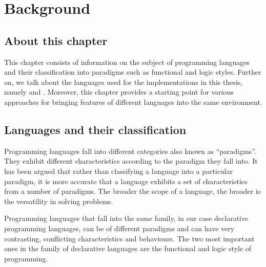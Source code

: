 \documentclass[thesis-solanki.tex]{subfiles}
\begin{document}
\chapter{Background}\label{chap:background}

\section{About this chapter}

This chapter consists of information on the subject of programming languages and their classification into
paradigms such as functional and logic styles.
Further on, we talk about the languages used for the implementations in this thesis, namely  and
.
Moreover, this chapter provides a starting point for various approaches for bringing features of different
languages into the same environment.


\section{Languages and their classification}
Programming languages fall into different categories also known as ``paradigms''.
They exhibit different characteristics according to the paradigm they fall into.
It has been argued \cite{Krishnamurthi:2008:TPL:1480828.1480846} that rather than classifying a language into a
particular paradigm, it is more accurate that a language exhibits a set of characteristics from a number of
paradigms.
The broader the scope of a language, the broader is the versatility in solving problems.

Programming languages that fall into the same family, in our case declarative programming languages, can be of
different paradigms and can have very contrasting, conflicting characteristics and behaviours.
The two most important ones in the family of declarative languages are the functional and
logic style of programming.
\end{document}

